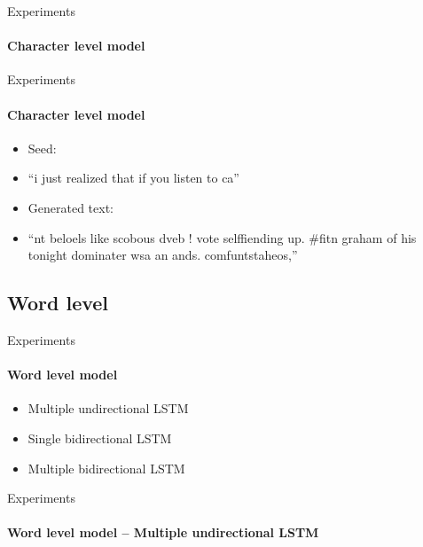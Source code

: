 \documentclass{beamer}
\begin{document}
\begin{frame}{Experiments}
\framesubtitle{Character level model}
\end{frame}

\begin{frame}{Experiments}
\framesubtitle{Character level model}
\begin{itemize}
\item Seed:
\item[] ``i just realized that if you listen to ca''
\vspace{5mm}
\item Generated text:
\item[] ``nt beloels like scobous dveb ! vote selffiending up. \#fitn graham of his tonight dominater wsa an ands. comfuntstaheos,''
\end{itemize}
\end{frame}

\subsection{Word level}

\begin{frame}{Experiments}
\framesubtitle{Word level model}
\begin{itemize}
\item Multiple undirectional LSTM
\vspace{3mm}
\item Single bidirectional LSTM
\vspace{3mm}
\item Multiple bidirectional LSTM
\end{itemize}
\end{frame}

\begin{frame}{Experiments}
\framesubtitle{Word level model -- Multiple undirectional LSTM}
\end{frame}
\end{document}
